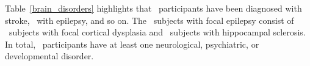 

\noindent
Table~\ref{brain_disorders} highlights that \SubjectsWithStrokeCount\ participants have been 
diagnosed with stroke, \SubjectsWithEpilepsyCount\ with epilepsy, and so on. 
The \SubjectsWithFocalEpilepsyCount\ subjects with focal epilepsy consist of \SubjectsWithFCDCount\ subjects 
with focal cortical dysplasia and \SubjectsWithHSCount\ subjects with hippocampal sclerosis.
In total, \TotalSubjectsWithDisordersCount\ participants have at least one neurological, psychiatric, or developmental disorder.



